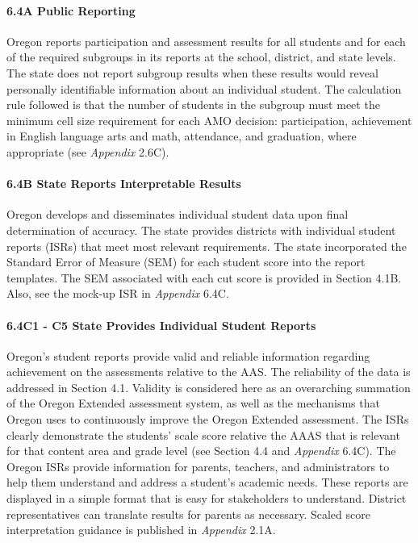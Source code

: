 \documentclass[]{article}
\let\oldparagraph\paragraph
\renewcommand{\paragraph}[1]{\oldparagraph{#1}\mbox{}}
\begin{document}
\hypertarget{a-public-reporting}{%
\paragraph{6.4A Public Reporting}\label{a-public-reporting}}

Oregon reports participation and assessment results for all students and
for each of the required subgroups in its reports at the school,
district, and state levels. The state does not report subgroup results
when these results would reveal personally identifiable information
about an individual student. The calculation rule followed is that the
number of students in the subgroup must meet the minimum cell size
requirement for each AMO decision: participation, achievement in English
language arts and math, attendance, and graduation, where appropriate
(see \emph{Appendix} 2.6C).

\hypertarget{b-state-reports-interpretable-results}{%
\paragraph{6.4B State Reports Interpretable
Results}\label{b-state-reports-interpretable-results}}

Oregon develops and disseminates individual student data upon final
determination of accuracy. The state provides districts with individual
student reports (ISRs) that meet most relevant requirements. The state
incorporated the Standard Error of Measure (SEM) for each student score
into the report templates. The SEM associated with each cut score is
provided in Section 4.1B. Also, see the mock-up ISR in \emph{Appendix}
6.4C.

\hypertarget{c1---c5-state-provides-individual-student-reports}{%
\paragraph{6.4C1 - C5 State Provides Individual Student
Reports}\label{c1---c5-state-provides-individual-student-reports}}

Oregon's student reports provide valid and reliable information
regarding achievement on the assessments relative to the AAS. The
reliability of the data is addressed in Section 4.1. Validity is
considered here as an overarching summation of the Oregon Extended
assessment system, as well as the mechanisms that Oregon uses to
continuously improve the Oregon Extended assessment. The ISRs clearly
demonstrate the students' scale score relative the AAAS that is relevant
for that content area and grade level (see Section 4.4 and
\emph{Appendix} 6.4C). The Oregon ISRs provide information for parents,
teachers, and administrators to help them understand and address a
student's academic needs. These reports are displayed in a simple format
that is easy for stakeholders to understand. District representatives
can translate results for parents as necessary. Scaled score
interpretation guidance is published in \emph{Appendix} 2.1A.
\end{document}
